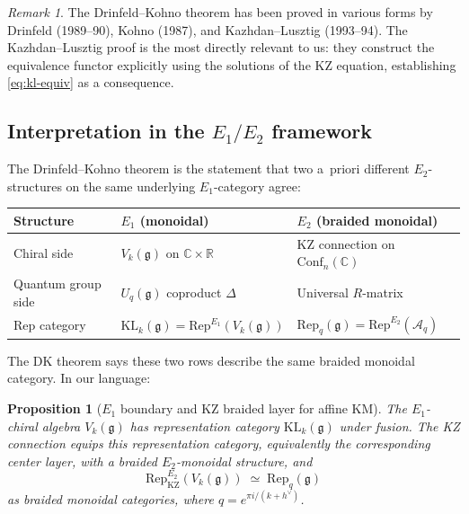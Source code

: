\documentclass[11pt]{article}
\newtheorem{proposition}[theorem]{Proposition}
\theoremstyle{definition}
\theoremstyle{remark}
\newtheorem{remark}[theorem]{Remark}
\newcommand{\Rep}{\mathrm{Rep}}
\newcommand{\Uq}{U_q}
\newcommand{\cA}{\mathcal{A}}
\newcommand{\frakg}{\mathfrak{g}}
\newcommand{\KL}{\mathrm{KL}}
\newcommand{\KZ}{\mathrm{KZ}}
\newcommand{\hv}{h^\vee}
\begin{document}
\begin{remark}
The Drinfeld--Kohno theorem has been proved in various forms by
Drinfeld (1989--90), Kohno (1987), and Kazhdan--Lusztig (1993--94).
The Kazhdan--Lusztig proof is the most directly relevant to us:
they construct the equivalence functor explicitly using the solutions
of the KZ equation, establishing \eqref{eq:kl-equiv} as a consequence.
\end{remark}

\subsection{Interpretation in the $E_1/E_2$ framework}
\label{subsec:e1-e2-interpretation}

The Drinfeld--Kohno theorem is the statement that two a~priori different
$E_2$-structures on the same underlying $E_1$-category agree:

\begin{center}
\renewcommand{\arraystretch}{1.5}
\begin{tabular}{lll}
 \hline
 \textbf{Structure} & \textbf{$E_1$ (monoidal)} & \textbf{$E_2$ (braided monoidal)} \\
 \hline
 Chiral side & $V_k(\frakg)$ on $\mathbb{C} \times \mathbb{R}$ &
 KZ connection on $\mathrm{Conf}_n(\mathbb{C})$ \\
 Quantum group side & $\Uq(\frakg)$ coproduct $\Delta$ &
 Universal $R$-matrix \\
 $\Rep$ category & $\KL_k(\frakg) = \Rep^{E_1}(V_k(\frakg))$ &
 $\Rep_q(\frakg) = \Rep^{E_2}(\cA_q)$ \\
 \hline
\end{tabular}
\end{center}

The DK theorem says these two rows describe the same braided monoidal
category. In our language:

\begin{proposition}[$E_1$ boundary and KZ braided layer for affine KM]
\label{prop:e1-e2-coherence}
The $E_1$-chiral algebra $V_k(\frakg)$ has representation category
$\KL_k(\frakg)$ under fusion. The KZ connection equips this
representation category, equivalently the corresponding center layer,
with a braided $E_2$-monoidal structure, and
\[
 \Rep^{E_2}_{\KZ}(V_k(\frakg)) \;\simeq\; \Rep_q(\frakg)
\]
as braided monoidal categories, where $q = e^{\pi i/(k+\hv)}$.
\end{proposition}
\end{document}
